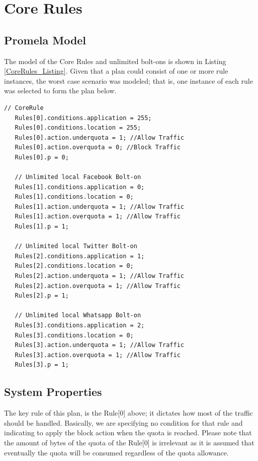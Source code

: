 \section{Core Rules}
\subsection{Promela Model}
\noindent
The model of the Core Rules and unlimited bolt-ons is shown in Listing \ref{CoreRules_Listing}. Given that a plan could consist of one or more rule instances, the worst case scenario was modeled; that is, one instance of each rule was selected to form the plan below.  \\

\singlespacing
\begin{lstlisting}[caption=Core-Rules-based Plan Model,
  label=CoreRules_Listing]
   // CoreRule
   Rules[0].conditions.application = 255;
   Rules[0].conditions.location = 255;
   Rules[0].action.underquota = 1; //Allow Traffic
   Rules[0].action.overquota = 0; //Block Traffic
   Rules[0].p = 0; 
   
   // Unlimited local Facebook Bolt-on
   Rules[1].conditions.application = 0;
   Rules[1].conditions.location = 0;
   Rules[1].action.underquota = 1; //Allow Traffic
   Rules[1].action.overquota = 1; //Allow Traffic
   Rules[1].p = 1;

   // Unlimited local Twitter Bolt-on
   Rules[2].conditions.application = 1;
   Rules[2].conditions.location = 0;
   Rules[2].action.underquota = 1; //Allow Traffic
   Rules[2].action.overquota = 1; //Allow Traffic
   Rules[2].p = 1;

   // Unlimited local Whatsapp Bolt-on
   Rules[3].conditions.application = 2;
   Rules[3].conditions.location = 0;
   Rules[3].action.underquota = 1; //Allow Traffic
   Rules[3].action.overquota = 1; //Allow Traffic
   Rules[3].p = 1;
\end{lstlisting}
\doublespacing

   
\subsection{System Properties}
\noindent The key rule of this plan, is the Rule[0] above; it dictates how most of the traffic should be handled. Basically, we are specifying no condition for that rule and indicating to apply the block action when the quota is reached. Please note that the amount of bytes of the quota of the Rule[0] is irrelevant as it is assumed that eventually the quota will be consumed regardless of the quota allowance. \\

